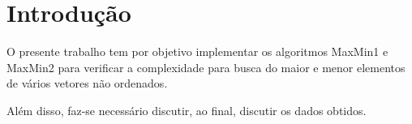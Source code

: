 


\chapter{Introdução}
\label{chap:introducao}

O presente trabalho tem por objetivo implementar os algoritmos MaxMin1 e MaxMin2 para verificar a complexidade para busca do maior e menor elementos de vários vetores não ordenados. 

Além disso, faz-se necessário discutir, ao final, discutir os dados obtidos.





